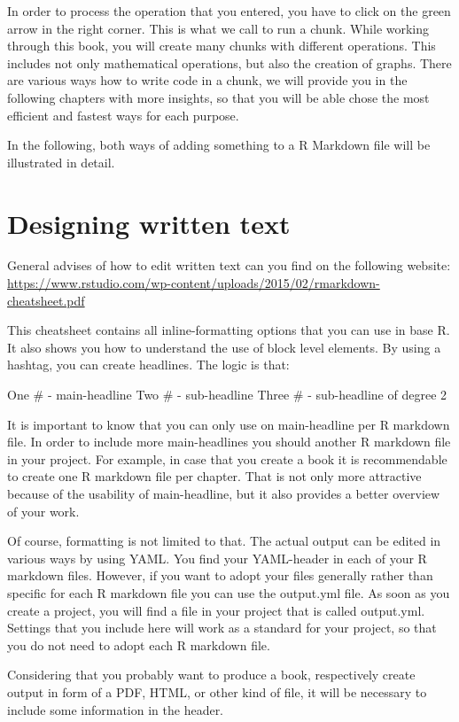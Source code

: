 \documentclass[]{report}
\begin{document}
In order to process the operation that you entered, you have to click on
the green arrow in the right corner. This is what we call to run a
chunk. While working through this book, you will create many chunks with
different operations. This includes not only mathematical operations,
but also the creation of graphs. There are various ways how to write
code in a chunk, we will provide you in the following chapters with more
insights, so that you will be able chose the most efficient and fastest
ways for each purpose.

In the following, both ways of adding something to a R Markdown file
will be illustrated in detail.

\section{Designing written text}\label{designing-written-text}

General advises of how to edit written text can you find on the
following website:
\url{https://www.rstudio.com/wp-content/uploads/2015/02/rmarkdown-cheatsheet.pdf}

This cheatsheet contains all inline-formatting options that you can use
in base R. It also shows you how to understand the use of block level
elements. By using a hashtag, you can create headlines. The logic is
that:

One \# - main-headline Two \# - sub-headline Three \# - sub-headline of
degree 2

It is important to know that you can only use on main-headline per R
markdown file. In order to include more main-headlines you should
another R markdown file in your project. For example, in case that you
create a book it is recommendable to create one R markdown file per
chapter. That is not only more attractive because of the usability of
main-headline, but it also provides a better overview of your work.

Of course, formatting is not limited to that. The actual output can be
edited in various ways by using YAML. You find your YAML-header in each
of your R markdown files. However, if you want to adopt your files
generally rather than specific for each R markdown file you can use the
output.yml file. As soon as you create a project, you will find a file
in your project that is called output.yml. Settings that you include
here will work as a standard for your project, so that you do not need
to adopt each R markdown file.

Considering that you probably want to produce a book, respectively
create output in form of a PDF, HTML, or other kind of file, it will be
necessary to include some information in the header.
\end{document}
